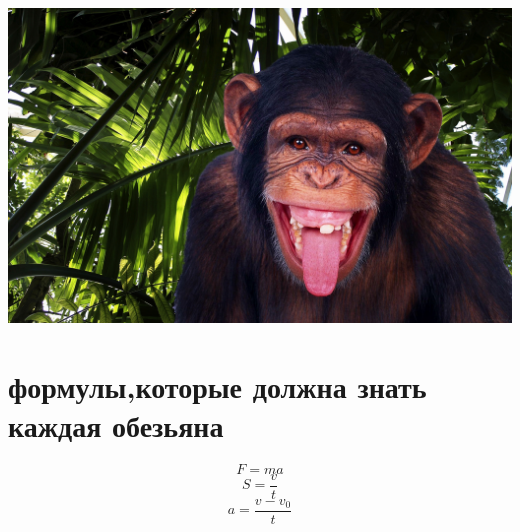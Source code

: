 \documentclass[a4paper, 12pt]{report}
\begin{document}
\includegraphics[scale=0.2]{monkey.jpeg}
	\section{формулы,которые должна знать каждая обезьяна}
\begin{equation}
	F = ma
\end{equation}
\begin{equation}
	S=\frac{v}{t}
\end{equation}
\begin{equation}
	a=\frac{v-v_0}{t}
\end{equation}	
\end{document}
